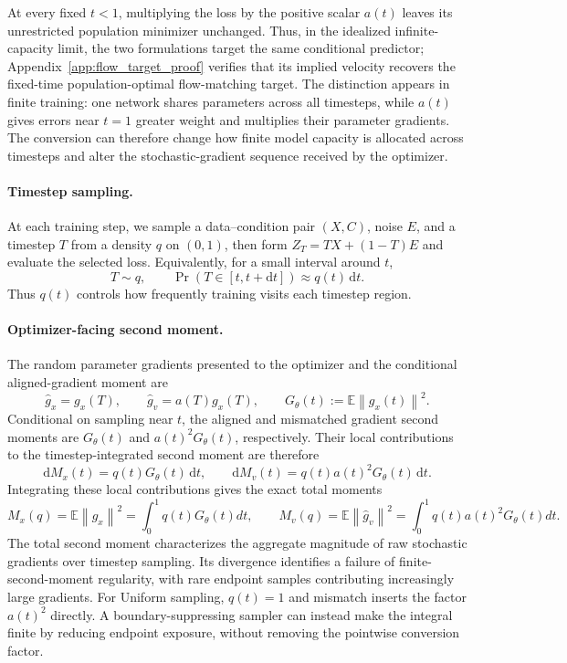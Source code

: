 \documentclass{article}
\theoremstyle{plain}
\theoremstyle{definition}
\theoremstyle{remark}
\newcommand{\Ex}{\mathbb{E}}
\newcommand{\norm}[1]{\left\lVert #1\right\rVert}
\begin{document}
At every fixed $t<1$, multiplying the loss by the positive scalar $a(t)$ leaves its unrestricted population minimizer unchanged. Thus, in the idealized infinite-capacity limit, the two formulations target the same conditional predictor; Appendix~\ref{app:flow_target_proof} verifies that its implied velocity recovers the fixed-time population-optimal flow-matching target. The distinction appears in finite training: one network shares parameters across all timesteps, while $a(t)$ gives errors near $t=1$ greater weight and multiplies their parameter gradients. The conversion can therefore change how finite model capacity is allocated across timesteps and alter the stochastic-gradient sequence received by the optimizer.

\paragraph{Timestep sampling.}
At each training step, we sample a data--condition pair $(X,C)$, noise $E$, and a timestep $T$ from a density $q$ on $(0,1)$, then form $Z_T=TX+(1-T)E$ and evaluate the selected loss. Equivalently, for a small interval around $t$,
\begin{equation}
T\sim q,\qquad
\Pr(T\in[t,t+\mathrm{d}t])\approx q(t)\,\mathrm{d}t.
\label{eq:timestep_sampling}
\end{equation}
Thus $q(t)$ controls how frequently training visits each timestep region.

\paragraph{Optimizer-facing second moment.}
The random parameter gradients presented to the optimizer and the conditional aligned-gradient moment are
\begin{equation}
\hat g_x=g_x(T),\qquad
\hat g_v=a(T)g_x(T),\qquad
G_\theta(t):=\Ex\norm{g_x(t)}^2.
\label{eq:optimizer_gradients}
\end{equation}
Conditional on sampling near $t$, the aligned and mismatched gradient second moments are $G_\theta(t)$ and $a(t)^2G_\theta(t)$, respectively. Their local contributions to the timestep-integrated second moment are therefore
\begin{equation}
\mathrm{d}M_x(t)=q(t)G_\theta(t)\,\mathrm{d}t,
\qquad
\mathrm{d}M_v(t)=q(t)a(t)^2G_\theta(t)\,\mathrm{d}t.
\label{eq:local_second_moment}
\end{equation}
Integrating these local contributions gives the exact total moments
\begin{equation}
M_x(q)=\Ex\norm{\hat g_x}^2=\int_0^1q(t)G_\theta(t)dt,
\qquad
M_v(q)=\Ex\norm{\hat g_v}^2=\int_0^1q(t)a(t)^2G_\theta(t)dt.
\label{eq:optimizer_second_moments}
\end{equation}
The total second moment characterizes the aggregate magnitude of raw stochastic gradients over timestep sampling. Its divergence identifies a failure of finite-second-moment regularity, with rare endpoint samples contributing increasingly large gradients. For Uniform sampling, $q(t)=1$ and mismatch inserts the factor $a(t)^2$ directly. A boundary-suppressing sampler can instead make the integral finite by reducing endpoint exposure, without removing the pointwise conversion factor.
\end{document}
